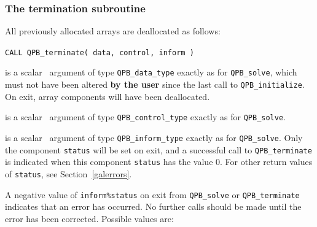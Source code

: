 \documentclass{galahad}
\newcommand{\packagename}{QPB}
\begin{document}

\subsubsection{The  termination subroutine}
All previously allocated arrays are deallocated as follows:
\vspace*{1mm}

\hspace{8mm}
{\tt CALL \packagename\_terminate( data, control, inform )}

\vspace*{-3mm}
\begin{description}

 is a scalar \intentinout\ argument of type 
{\tt \packagename\_data\_type} 
exactly as for
{\tt \packagename\_solve},
which must not have been altered {\bf by the user} since the last call to 
{\tt \packagename\_initialize}.
On exit, array components will have been deallocated.

 is a scalar \intentin\ argument of type 
{\tt \packagename\_control\_type}
exactly as for
{\tt \packagename\_solve}.

 is a scalar \intentout\ argument of type
{\tt \packagename\_inform\_type}
exactly as for
{\tt \packagename\_solve}.
Only the component {\tt status} will be set on exit, and a 
successful call to 
{\tt \packagename\_terminate}
is indicated when this  component {\tt status} has the value 0. 
For other return values of {\tt status}, see Section~\ref{galerrors}.

\end{description}


\galerrors
A negative value of {\tt inform\%status} on exit from 
{\tt \packagename\_solve}
or 
{\tt \packagename\_terminate}
indicates that an error has occurred. No further calls should be made
until the error has been corrected. Possible values are:
\end{document}
